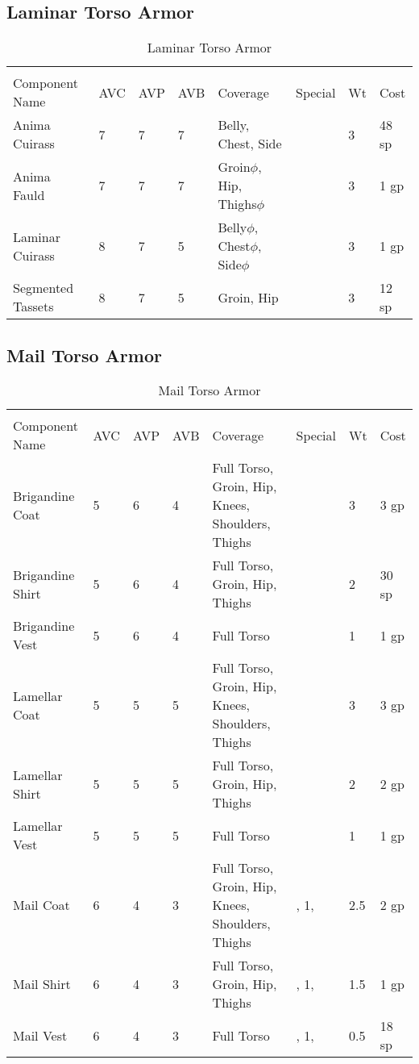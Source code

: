 \documentclass[oneside,11pt,english]{book}
\begin{document}
\subsection{Laminar Torso Armor}
\begin{longtabu} to 
  \captionsetup{textformat=empty, labelformat=blank}
  \caption{Laminar Torso Armor} \vspace{-15pt}
  \label{tab:Laminar Torso Armor}\\
  Component Name&AVC&AVP&AVB& Coverage& Special& Wt&Cost\\\toprule
  Anima Cuirass& 7& 7& 7& Belly, Chest, Side& & 3& 48 sp\\
  Anima Fauld& 7& 7& 7& Groin\hyperref[sec:Weak Spots]{$\phi$}, Hip, Thighs\hyperref[sec:Weak Spots]{$\phi$}& & 3& 1 gp\\
  Laminar Cuirass& 8& 7& 5& Belly\hyperref[sec:Weak Spots]{$\phi$}, Chest\hyperref[sec:Weak Spots]{$\phi$}, Side\hyperref[sec:Weak Spots]{$\phi$}& & 3& 1 gp\\
  Segmented Tassets& 8& 7& 5& Groin, Hip& & 3& 12 sp\\
\end{longtabu}
\subsection{Mail Torso Armor}
\begin{longtabu} to 
  \captionsetup{textformat=empty, labelformat=blank}
  \caption{Mail Torso Armor} \vspace{-15pt}
  \label{tab:Mail Torso Armor}\\
  Component Name&AVC&AVP&AVB& Coverage& Special& Wt&Cost\\\toprule
  Brigandine Coat& 5& 6& 4& Full Torso, Groin, Hip, Knees, Shoulders, Thighs& & 3& 3 gp\\
  Brigandine Shirt& 5& 6& 4& Full Torso, Groin, Hip, Thighs& & 2& 30 sp\\
  Brigandine Vest& 5& 6& 4& Full Torso& & 1& 1 gp\\
  Lamellar Coat& 5& 5& 5& Full Torso, Groin, Hip, Knees, Shoulders, Thighs& & 3& 3 gp\\
  Lamellar Shirt& 5& 5& 5& Full Torso, Groin, Hip, Thighs& & 2& 2 gp\\
  Lamellar Vest& 5& 5& 5& Full Torso& & 1& 1 gp\\
  Mail Coat& 6& 4& 3& Full Torso, Groin, Hip, Knees, Shoulders, Thighs& ,  1, & 2.5& 2 gp\\
  Mail Shirt& 6& 4& 3& Full Torso, Groin, Hip, Thighs& ,  1, & 1.5& 1 gp\\
  Mail Vest& 6& 4& 3& Full Torso& ,  1, & 0.5& 18 sp\\
\end{longtabu}
\end{document}
